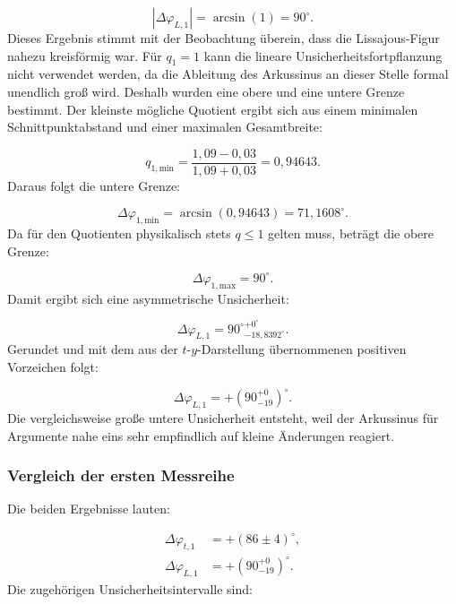 \documentclass{report}
\begin{document}
\begin{equation}
|\Delta\varphi_{L,1}|
=
\arcsin(1)
=
90^\circ.
\end{equation}
\noindent
Dieses Ergebnis stimmt mit der Beobachtung überein, dass die Lissajous-Figur nahezu kreisförmig war.
\noindent
Für $q_1=1$ kann die lineare Unsicherheitsfortpflanzung nicht verwendet werden, da die Ableitung des Arkussinus an dieser Stelle formal unendlich groß wird. Deshalb wurden eine obere und eine untere Grenze bestimmt.
\noindent
Der kleinste mögliche Quotient ergibt sich aus einem minimalen Schnittpunktabstand und einer maximalen Gesamtbreite:

\begin{equation}
q_{1,\mathrm{min}}
=
\frac{1{,}09-0{,}03}{1{,}09+0{,}03}
=
0{,}94643.
\end{equation}
\noindent
Daraus folgt die untere Grenze:

\begin{equation}
\Delta\varphi_{1,\mathrm{min}}
=
\arcsin(0{,}94643)
=
71{,}1608^\circ.
\end{equation}
\noindent
Da für den Quotienten physikalisch stets $q\leq1$ gelten muss, beträgt die obere Grenze:

\begin{equation}
\Delta\varphi_{1,\mathrm{max}}=90^\circ.
\end{equation}
\noindent
Damit ergibt sich eine asymmetrische Unsicherheit:

\begin{equation}
\Delta\varphi_{L,1}
=
90^\circ{}^{+0^\circ}_{-18{,}8392^\circ}.
\end{equation}
\noindent
Gerundet und mit dem aus der $t$-$y$-Darstellung übernommenen positiven Vorzeichen folgt:

\begin{equation}
\boxed{
\Delta\varphi_{L,1}
=
+\left(90^{+0}_{-19}\right)^\circ
}.
\label{eq:result_lissajous_1}
\end{equation}
\noindent
Die vergleichsweise große untere Unsicherheit entsteht, weil der Arkussinus für Argumente nahe eins sehr empfindlich auf kleine Änderungen reagiert.

\subsubsection{Vergleich der ersten Messreihe}
\noindent
Die beiden Ergebnisse lauten:

\begin{align}
\Delta\varphi_{t,1}&=+(86\pm4)^\circ,\\
\Delta\varphi_{L,1}&=+\left(90^{+0}_{-19}\right)^\circ.
\end{align}
\noindent
Die zugehörigen Unsicherheitsintervalle sind:
\end{document}
